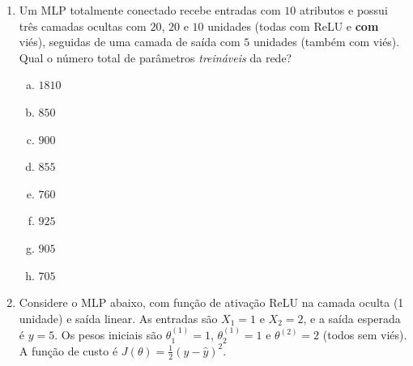 \documentclass{dlproblemset}
\begin{document}
\begin{enumerate}[1)]
    \begin{enumerate}[(a)]
        \item $\theta^{(1)}_{11} = 0.8$ \quad e \quad $\theta^{(1)}_{21} = 0.6$
        \item $\theta^{(1)}_{11} = 0.6$ \quad e \quad $\theta^{(1)}_{21} = 0.6$
        \item $\theta^{(1)}_{11} = 1.0$ \quad e \quad $\theta^{(1)}_{21} = 0.8$
        \item $\theta^{(1)}_{11} = 1.0$ \quad e \quad $\theta^{(1)}_{21} = 0.6$
        \item $\theta^{(1)}_{11} = 1.0$ \quad e \quad $\theta^{(1)}_{21} = 1.0$
        \item $\theta^{(1)}_{11} = 0.6$ \quad e \quad $\theta^{(1)}_{21} = 0.8$
        \item $\theta^{(1)}_{11} = 1.0$ \quad e \quad $\theta^{(1)}_{21} = 0.4$
        \item $\theta^{(1)}_{11} = 0.96$ \quad e \quad $\theta^{(1)}_{21} = 0.6$
    \end{enumerate}

    \item Um MLP totalmente conectado recebe entradas com $10$ atributos e possui três camadas ocultas com $20$, $20$ e $10$ unidades (todas com ReLU e \textbf{com} viés), seguidas de uma camada de saída com $5$ unidades (também com viés). Qual o número total de parâmetros \emph{treináveis} da rede?
    \begin{enumerate}[(a)]
        \item $1810$
        \item $850$
        \item $900$
        \item $855$
        \item $760$
        \item $925$
        \item $905$
        \item $705$
    \end{enumerate}

    \item Considere o MLP abaixo, com função de ativação ReLU na camada oculta (1 unidade) e saída linear. As entradas são $X_1 = 1$ e $X_2 = 2$, e a saída esperada é $y = 5$. Os pesos iniciais são $\theta^{(1)}_1 = 1$, $\theta^{(1)}_2 = 1$ e $\theta^{(2)} = 2$ (todos sem viés). A função de custo é $J(\theta) = \tfrac{1}{2}(y - \hat{y})^2$.


\end{enumerate}
\end{document}
